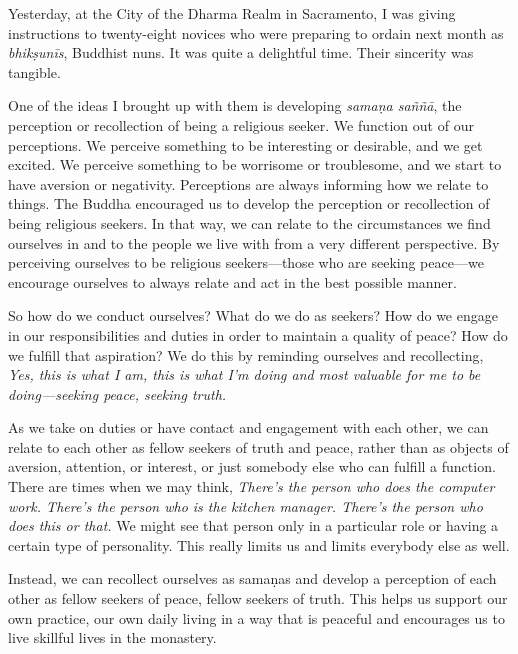 
Yesterday, at the City of the Dharma Realm in Sacramento, I was giving 
instructions to twenty-eight novices who were preparing to ordain next 
month as \emph{bhikṣunīs}, Buddhist nuns. It was quite a delightful 
time. Their sincerity was tangible.

One of the ideas I brought up with them is developing \emph{samaṇa 
saññā}, the perception or recollection of being a religious seeker. 
We function out of our perceptions. We perceive something to be 
interesting or desirable, and we get excited. We perceive something to 
be worrisome or troublesome, and we start to have aversion or 
negativity. Perceptions are always informing how we relate to things. 
The Buddha encouraged us to develop the perception or recollection of 
being religious seekers. In that way, we can relate to the 
circumstances we find ourselves in and to the people we live with from 
a very different perspective. By perceiving ourselves to be religious 
seekers---those who are seeking peace---we encourage ourselves to 
always relate and act in the best possible manner.

So how do we conduct ourselves? What do we do as seekers? How do we 
engage in our responsibilities and duties in order to maintain a 
quality of peace? How do we fulfill that aspiration? We do this by 
reminding ourselves and recollecting, \emph{Yes, this is what I am, 
this is what I'm doing and most valuable for me to be doing---seeking 
peace, seeking truth.}

As we take on duties or have contact and engagement with each other, we 
can relate to each other as fellow seekers of truth and peace, rather 
than as objects of aversion, attention, or interest, or just somebody 
else who can fulfill a function. There are times when we may think, 
\emph{There's the person who does the computer work. There's the person 
who is the kitchen manager. There's the person who does this or that.} 
We might see that person only in a particular role or having a certain 
type of personality. This really limits us and limits everybody else as 
well.

Instead, we can recollect ourselves as samaṇas and develop a 
perception of each other as fellow seekers of peace, fellow seekers of 
truth. This helps us support our own practice, our own daily living in 
a way that is peaceful and encourages us to live skillful lives in the 
monastery.


